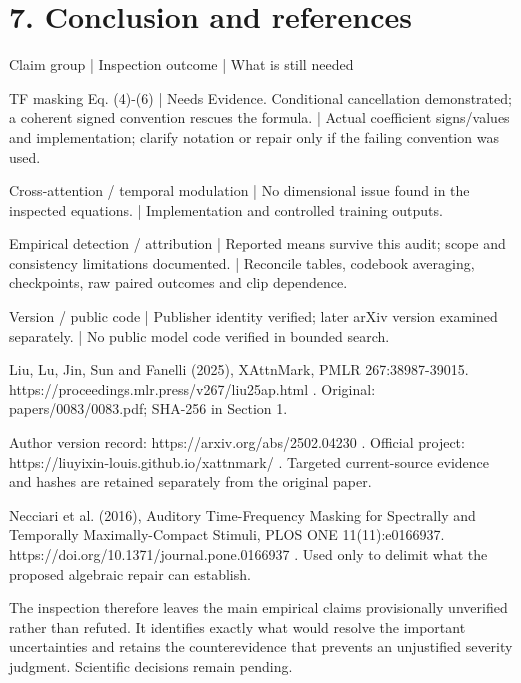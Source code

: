 \documentclass[10pt]{article}
\begin{document}
\section*{7. Conclusion and references}
Claim group | Inspection outcome | What is still needed\par
TF masking Eq. (4)-(6) | Needs Evidence. Conditional cancellation demonstrated; a coherent signed convention rescues the formula. | Actual coefficient signs/values and implementation; clarify notation or repair only if the failing convention was used.\par
Cross-attention / temporal modulation | No dimensional issue found in the inspected equations. | Implementation and controlled training outputs.\par
Empirical detection / attribution | Reported means survive this audit; scope and consistency limitations documented. | Reconcile tables, codebook averaging, checkpoints, raw paired outcomes and clip dependence.\par
Version / public code | Publisher identity verified; later arXiv version examined separately. | No public model code verified in bounded search.\par
[P1] Liu, Lu, Jin, Sun and Fanelli (2025), XAttnMark, PMLR 267:38987-39015. https://proceedings.mlr.press/v267/liu25ap.html . Original: papers/0083/0083.pdf; SHA-256 in Section 1.\par
[P2] Author version record: https://arxiv.org/abs/2502.04230 . Official project: https://liuyixin-louis.github.io/xattnmark/ . Targeted current-source evidence and hashes are retained separately from the original paper.\par
[P3] Necciari et al. (2016), Auditory Time-Frequency Masking for Spectrally and Temporally Maximally-Compact Stimuli, PLOS ONE 11(11):e0166937. https://doi.org/10.1371/journal.pone.0166937 . Used only to delimit what the proposed algebraic repair can establish.\par
The inspection therefore leaves the main empirical claims provisionally unverified rather than refuted. It identifies exactly what would resolve the important uncertainties and retains the counterevidence that prevents an unjustified severity judgment. Scientific decisions remain pending.\par
\end{document}
